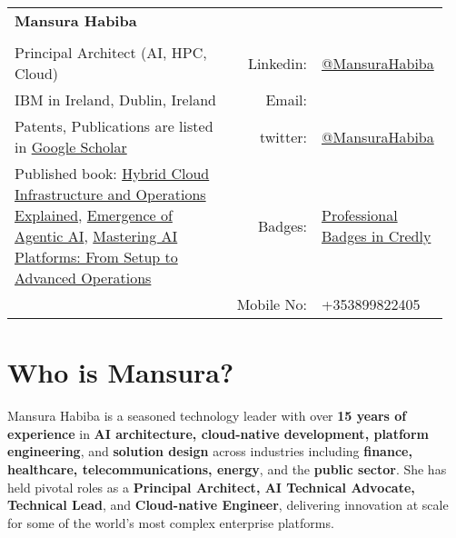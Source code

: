 \documentclass[12pt,parskip=half]{scrartcl}
\date{}
\begin{document}
\begin{table}[h]
{\def\arraystretch{1.2}\tabcolsep=0pt
\begin{tabular}{p{0.50\linewidth}p{0.20\linewidth}p{0.25\linewidth}}

  \multirow{1}{*}{\LARGE \textbf{Mansura Habiba}} &  &  \\
  
  & & \\
  
Principal Architect (AI, HPC, Cloud) & \multicolumn{1}{r}{Linkedin:\;\;}  & \multicolumn{1}{l}{\href{https://www.linkedin.com/in/mansura-h-a0174a19}{@MansuraHabiba}} \\
  
IBM in Ireland, Dublin, Ireland & \multicolumn{1}{r}{Email:\;\;} &\multicolumn{1}{l}{} \\


  Patents, Publications are listed in \href{https://scholar.google.com/citations?user=oee3rpwAAAAJ}{Google Scholar} & \multicolumn{1}{r}{twitter:\;\;}  & \multicolumn{1}{l}{\href{https://twitter.com/MansuraHabiba}{@MansuraHabiba}} \\

Published book: \href{https://packt.link/a/9781803248318}{Hybrid Cloud Infrastructure and Operations Explained}, \href{https://leanpub.com/emergence-agentic-ai}{Emergence of Agentic AI}, \href{https://leanpub.com/mastering-ai-operations}{Mastering AI Platforms: From Setup to Advanced Operations
} & \multicolumn{1}{r}{ Badges:\;\;}  & \multicolumn{1}{l}{\href{https://www.credly.com/users/mansura-habiba/badges}{Professional Badges in Credly}}\\

 & \multicolumn{1}{r}{ Mobile No:\;\;}  & \multicolumn{1}{l}{+353899822405}\\
\end{tabular}%
}
\end{table}

\vspace{0.3cm}

\section*{Who is Mansura?}

Mansura Habiba is a seasoned technology leader with over \textbf{15 years of experience} in \textbf{AI architecture, cloud-native development, platform engineering}, and \textbf{solution design} across industries including \textbf{finance, healthcare, telecommunications, energy}, and the \textbf{public sector}. She has held pivotal roles as a \textbf{Principal Architect, AI Technical Advocate, Technical Lead}, and \textbf{Cloud-native Engineer}, delivering innovation at scale for some of the world’s most complex enterprise platforms.
\end{document}
